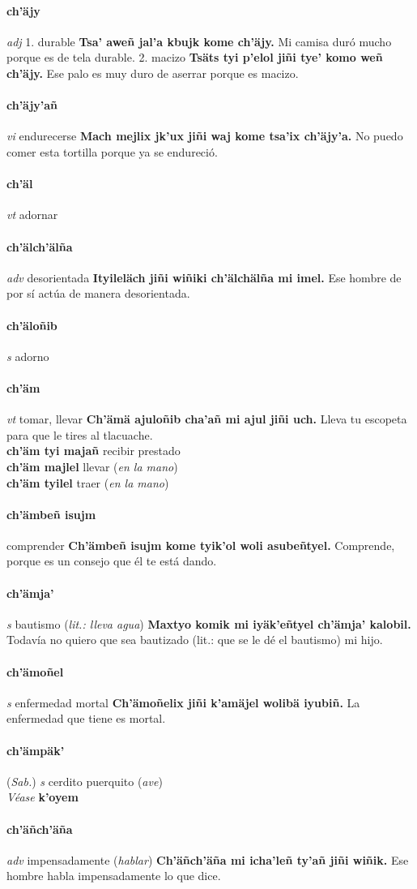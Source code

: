 \documentclass{scrbook}
\newcommand{\entry}[1]{\paragraph{#1}}
\newcommand{\onedefinition}[1]{#1.}
\newcommand{\partofspeech}[1]{\textit{#1}}
\newcommand{\spanishtranslation}[1]{#1}
\newcommand{\clarification}[1]{(\textit{#1})}
\newcommand{\cholexample}[1]{\textbf{#1}}
\newcommand{\exampletranslation}[1]{#1}
\newcommand{\alsosee}[1]{\\\textit{Véase} \textbf{#1}}
\newcommand{\relevantdialect}[1]{(\textit{#1})}
\newcommand{\secondaryentry}[1]{\\\textbf{#1}}
\newcommand{\secondtranslation}[1]{#1}
\begin{document}
\begin{multicols}{2}
\entry{ch'äjy}
\partofspeech{adj}
\onedefinition{1}
\spanishtranslation{durable}
\cholexample{Tsa' aweñ jal'a kbujk kome ch'äjy.}
\exampletranslation{Mi camisa duró mucho porque es de tela durable.}
\onedefinition{2}
\spanishtranslation{macizo}
\cholexample{Tsäts tyi p'elol jiñi tye' komo weñ ch'äjy.}
\exampletranslation{Ese palo es muy duro de aserrar porque es macizo.}

\entry{ch'äjy'añ}
\partofspeech{vi}
\spanishtranslation{endurecerse}
\cholexample{Mach mejlix jk'ux jiñi waj kome tsa'ix ch'äjy'a.}
\exampletranslation{No puedo comer esta tortilla porque ya se endureció.}

\entry{ch'äl}
\partofspeech{vt}
\spanishtranslation{adornar}

\entry{ch'älch'älña}
\partofspeech{adv}
\spanishtranslation{desorientada}
\cholexample{Ityileläch jiñi wiñiki ch'älchälña mi imel.}
\exampletranslation{Ese hombre de por sí actúa de manera desorientada.}

\entry{ch'äloñib}
\partofspeech{s}
\spanishtranslation{adorno}

\entry{ch'äm}
\partofspeech{vt}
\spanishtranslation{tomar, llevar}
\cholexample{Ch'ämä ajuloñib cha'añ mi ajul jiñi uch.}
\exampletranslation{Lleva tu escopeta para que le tires al tlacuache.}
\secondaryentry{ch'äm tyi majañ}
\secondtranslation{recibir prestado}
\secondaryentry{ch'äm majlel}
\secondtranslation{llevar}
\clarification{en la mano}
\secondaryentry{ch'äm tyilel}
\secondtranslation{traer}
\clarification{en la mano}

\entry{ch'ämbeñ isujm}
\spanishtranslation{comprender}
\cholexample{Ch'ämbeñ isujm kome tyik'ol woli asubeñtyel.}
\exampletranslation{Comprende, porque es un consejo que él te está dando.}

\entry{ch'ämja'}
\partofspeech{s}
\spanishtranslation{bautismo}
\clarification{lit.: lleva agua}
\cholexample{Maxtyo komik mi iyäk'eñtyel ch'ämja' kalobil.}
\exampletranslation{Todavía no quiero que sea bautizado (lit.: que se le dé el bautismo) mi hijo.}

\entry{ch'ämoñel}
\partofspeech{s}
\spanishtranslation{enfermedad mortal}
\cholexample{Ch'ämoñelix jiñi k'amäjel wolibä iyubiñ.}
\exampletranslation{La enfermedad que tiene es mortal.}

\entry{ch'ämpäk'}
\relevantdialect{Sab.}
\partofspeech{s}
\spanishtranslation{cerdito}
\spanishtranslation{puerquito}
\clarification{ave}
\alsosee{k'oyem}

\entry{ch'äñch'äña}
\partofspeech{adv}
\spanishtranslation{impensadamente}
\clarification{hablar}
\cholexample{Ch'äñch'äña mi icha'leñ ty'añ jiñi wiñik.}
\exampletranslation{Ese hombre habla impensadamente lo que dice.}


\end{multicols}
\end{document}
